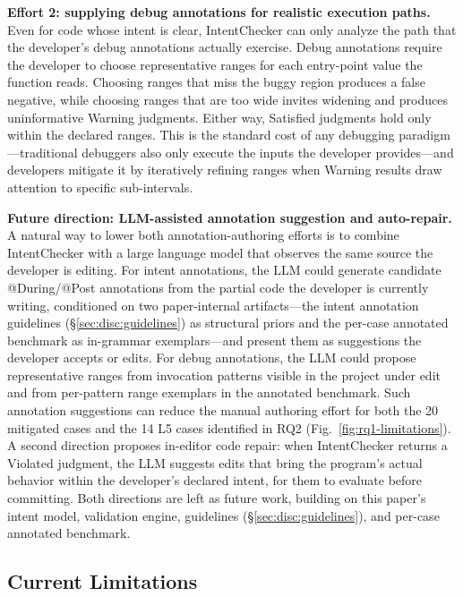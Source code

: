 \documentclass[pdflatex,sn-basic]{sn-jnl}%
\theoremstyle{thmstyleone}%
\theoremstyle{thmstyletwo}%
\theoremstyle{thmstylethree}%
\begin{document}
\smallskip
\noindent\textbf{Effort 2: supplying debug annotations for realistic execution paths.}
Even for code whose intent is clear, IntentChecker can only analyze the path that the developer's debug annotations actually exercise.
Debug annotations require the developer to choose representative ranges for each entry-point value the function reads. Choosing ranges that miss the buggy region produces a false negative, while choosing ranges that are too wide invites widening and produces uninformative Warning judgments. Either way, Satisfied judgments hold only within the declared ranges.
This is the standard cost of any debugging paradigm---traditional debuggers also only execute the inputs the developer provides---and developers mitigate it by iteratively refining ranges when Warning results draw attention to specific sub-intervals.

\smallskip
\noindent\textbf{Future direction: LLM-assisted annotation suggestion and auto-repair.}
A natural way to lower both annotation-authoring efforts is to combine IntentChecker with a large language model that observes the same source the developer is editing.
For intent annotations, the LLM could generate candidate @During/@Post annotations from the partial code the developer is currently writing, conditioned on two paper-internal artifacts---the intent annotation guidelines (\S\ref{sec:disc:guidelines}) as structural priors and the per-case annotated benchmark as in-grammar exemplars---and present them as suggestions the developer accepts or edits.
For debug annotations, the LLM could propose representative ranges from invocation patterns visible in the project under edit and from per-pattern range exemplars in the annotated benchmark.
Such annotation suggestions can reduce the manual authoring effort for both the 20 mitigated cases and the 14 L5 cases identified in RQ2 (Fig.~\ref{fig:rq1-limitations}).
A second direction proposes in-editor code repair: when IntentChecker returns a Violated judgment, the LLM suggests edits that bring the program's actual behavior within the developer's declared intent, for them to evaluate before committing.
Both directions are left as future work, building on this paper's intent model, validation engine, guidelines (\S\ref{sec:disc:guidelines}), and per-case annotated benchmark.

\subsection{Current Limitations}\label{sec:disc:tech}
\end{document}
